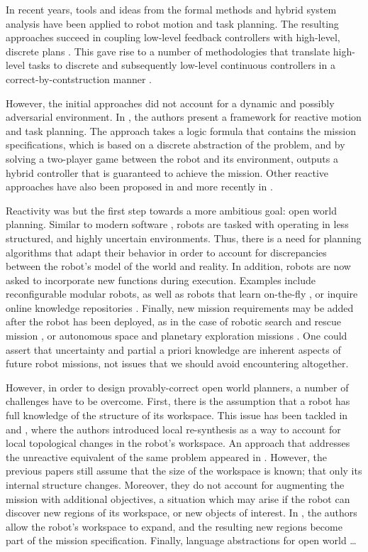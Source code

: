 In recent years, tools and ideas from the formal methods and hybrid system analysis have been applied to robot motion and task planning. The resulting approaches succeed in coupling low-level feedback controllers \cite{} with high-level, discrete plans \cite{}. This gave rise to a number of methodologies that translate high-level tasks to discrete and subsequently low-level continuous controllers in a correct-by-contstruction manner \cite{}.

However, the initial approaches did not account for a dynamic and possibly adversarial environment. In \cite{KGFP_TRO09}, the authors present a framework for reactive motion and task planning. The approach takes a logic formula that contains the mission specifications, which is based on a discrete abstraction of the problem, and by solving a two-player game between the robot and its environment, outputs a hybrid controller that is guaranteed to achieve the mission. Other reactive approaches have also been proposed in \cite{Wongpiromsarn2010} and more recently in \cite{Belta2013RSS}.

Reactivity was but the first step towards a more ambitious goal: open world planning. Similar to modern software \cite{open-world-sw}, robots are tasked with operating in less structured, and highly uncertain environments. Thus, there is a need for planning algorithms that adapt their behavior in order to account for discrepancies between the robot's model of the world and reality. In addition, robots are now asked to incorporate new functions during execution. Examples include reconfigurable modular robots, as well as robots that learn on-the-fly \cite{SaxenaIJRR2012}, or inquire online knowledge repositories \cite{rapyuta2013}. Finally, new mission requirements may be added after the robot has been deployed, as in the case of robotic search and rescue mission \cite{MatthiasAI2010}, or autonomous space and planetary exploration missions \cite{spaceXplore2006}. One could assert that uncertainty and partial a priori knowledge are inherent aspects of future robot missions, not issues that we should avoid encountering altogether.

However, in order to design provably-correct open world planners, a number of challenges have to be overcome. 
First, there is the assumption that a robot has full knowledge of the structure of its workspace. This issue has been tackled in \cite{MurrayICRA2012} and \cite{MurrayICRA2013a}, where the authors introduced local re-synthesis as a way to account for local topological changes in the robot's workspace. 
An approach that addresses the unreactive equivalent of the same problem appeared in \cite{Dimos2013ICRA}. 
However, the previous papers still assume that the size of the workspace is known; that only its internal structure changes. Moreover, they do not account for augmenting the mission with additional objectives, a situation which may arise if the robot can discover new regions of its workspace, or new objects of interest. In \cite{BingxinRSS2012}, the authors allow the robot's workspace to expand, and the resulting new regions become part of the mission specification.
Finally, language abstractions for open world \ldots

